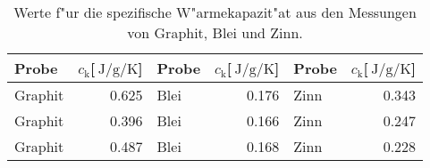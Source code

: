 
\begin{table}[!h]
\begin{center}
\begin{tabular}{|l|r|l|r|l|r|}
\hline
Probe & $c_\mathrm{k}$[$\SI{}{\joule\per\gram\per\kelvin}$] & Probe & $c_\mathrm{k}$[$\SI{}{\joule\per\gram\per\kelvin}$] & Probe & $c_\mathrm{k}$[$\SI{}{\joule\per\gram\per\kelvin}$]\\
\hline
\hline
Graphit & 0.625 & Blei & 0.176 & Zinn & 0.343 \\
Graphit & 0.396 & Blei & 0.166 & Zinn & 0.247 \\
Graphit & 0.487 & Blei & 0.168 & Zinn & 0.228 \\
\hline
\end{tabular}
\caption[]{Werte f"ur die spezifische W"armekapazit"at aus den Messungen von Graphit, Blei und Zinn.}
\label{kapa}
\end{center}
\end{table}